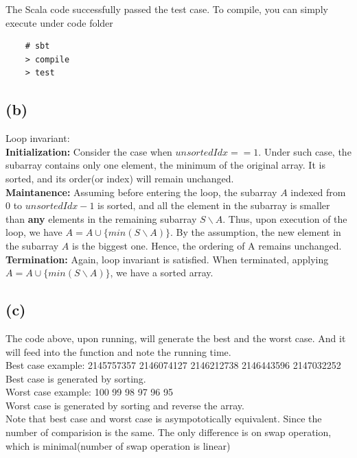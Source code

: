 \documentclass{article}
\begin{document}
The Scala code successfully passed the test case. To compile, you can simply execute under code folder
\begin{verbatim}
    # sbt
    > compile
    > test
\end{verbatim}
\subsection*{(b)}
Loop invariant: \\
\textbf{Initialization:} Consider the case when $unsortedIdx == 1$. Under such case, the subarray contains only one element,
the minimum of the original array. It is sorted, and its order(or index) will remain unchanged.
\\
\textbf{Maintanence:} Assuming before entering the loop, the subarray $A$ indexed from $0$ to $unsortedIdx - 1$ is sorted,
and all the element in the subarray is smaller than \textbf{any} elements in the remaining subarray $S \backslash A$.
Thus, upon execution of the loop, we have $ A = A \cup \{min(S \backslash A)\} $.
By the assumption, the new element in the subarray $ A $ is the biggest one. Hence,
the ordering of A remains unchanged. \\
\textbf{Termination:} Again, loop invariant is satisfied. When terminated, applying  $ A = A \cup \{min(S \backslash A)\} $, we have a sorted array.
\subsection*{(c)}
The code above, upon running, will generate the best and the worst case.
And it will feed into the function and note the running time. \\
Best case example: 2145757357 2146074127 2146212738 2146443596 2147032252 \\
Best case is generated by sorting. \\
Worst case example:  100 99 98 97 96 95 \\
Worst case is generated by sorting and reverse the array. \\
Note that best case and worst case is asympototically equivalent. Since the number of comparision
is the same. The only difference is on swap operation, which is minimal(number of swap operation
is linear)
\end{document}
